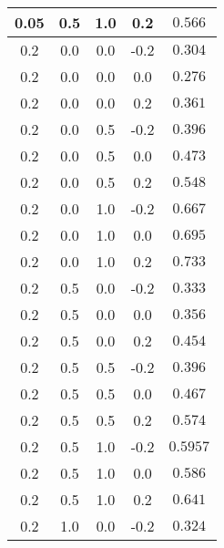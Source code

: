 \begin{longtable}{ccccc}
    0.05 & 0.5 & 1.0 &  0.2  & $0.566$ \\ \hline
    0.2 & 0.0 & 0.0 & -0.2  & $0.304$ \\
    0.2 & 0.0 & 0.0 &  0.0  & $0.276$ \\
    0.2 & 0.0 & 0.0 &  0.2  & $0.361$ \\ \hline
    0.2 & 0.0 & 0.5 & -0.2  & $0.396$ \\
    0.2 & 0.0 & 0.5 &  0.0  & $0.473$ \\
    0.2 & 0.0 & 0.5 &  0.2  & $0.548$ \\ \hline
    0.2 & 0.0 & 1.0 & -0.2  & $0.667$ \\
    0.2 & 0.0 & 1.0 &  0.0  & $0.695$ \\
    0.2 & 0.0 & 1.0 &  0.2  & $0.733$ \\ \hline
    0.2 & 0.5 & 0.0 & -0.2  & $0.333$ \\
    0.2 & 0.5 & 0.0 &  0.0  & $0.356$ \\
    0.2 & 0.5 & 0.0 &  0.2  & $0.454$ \\ \hline
    0.2 & 0.5 & 0.5 & -0.2  & $0.396$ \\
    0.2 & 0.5 & 0.5 &  0.0  & $0.467$ \\
    0.2 & 0.5 & 0.5 &  0.2  & $0.574$ \\ \hline
    0.2 & 0.5 & 1.0 & -0.2  & $0.5957$ \\
    0.2 & 0.5 & 1.0 &  0.0  & $0.586$ \\
    0.2 & 0.5 & 1.0 &  0.2  & $0.641$ \\ \hline
    0.2 & 1.0 & 0.0 & -0.2  & $0.324$ \\

\end{longtable}
